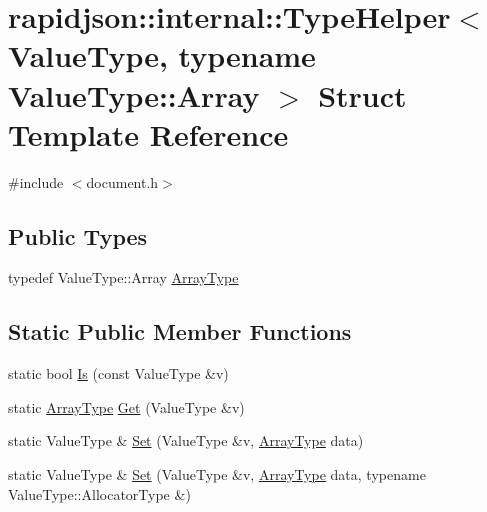 \hypertarget{structrapidjson_1_1internal_1_1_type_helper_3_01_value_type_00_01typename_01_value_type_1_1_array_01_4}{}\section{rapidjson\+::internal\+::Type\+Helper$<$ Value\+Type, typename Value\+Type\+::Array $>$ Struct Template Reference}
\label{structrapidjson_1_1internal_1_1_type_helper_3_01_value_type_00_01typename_01_value_type_1_1_array_01_4}


{\ttfamily \#include $<$document.\+h$>$}

\subsection*{Public Types}
\begin{DoxyCompactItemize}
\item 
typedef Value\+Type\+::\+Array \mbox{\hyperlink{structrapidjson_1_1internal_1_1_type_helper_3_01_value_type_00_01typename_01_value_type_1_1_array_01_4_af5f50f560631fef9cfc65b740145947a}{Array\+Type}}
\end{DoxyCompactItemize}
\subsection*{Static Public Member Functions}
\begin{DoxyCompactItemize}
\item 
static bool \mbox{\hyperlink{structrapidjson_1_1internal_1_1_type_helper_3_01_value_type_00_01typename_01_value_type_1_1_array_01_4_a8914d1a95dbffc359327c8fba620ae6d}{Is}} (const Value\+Type \&v)
\item 
static \mbox{\hyperlink{structrapidjson_1_1internal_1_1_type_helper_3_01_value_type_00_01typename_01_value_type_1_1_array_01_4_af5f50f560631fef9cfc65b740145947a}{Array\+Type}} \mbox{\hyperlink{structrapidjson_1_1internal_1_1_type_helper_3_01_value_type_00_01typename_01_value_type_1_1_array_01_4_a1c9de50e453294c4b8b32129b69eb7d1}{Get}} (Value\+Type \&v)
\item 
static Value\+Type \& \mbox{\hyperlink{structrapidjson_1_1internal_1_1_type_helper_3_01_value_type_00_01typename_01_value_type_1_1_array_01_4_acb9d4877fddc5f954c4f83cd11af61b1}{Set}} (Value\+Type \&v, \mbox{\hyperlink{structrapidjson_1_1internal_1_1_type_helper_3_01_value_type_00_01typename_01_value_type_1_1_array_01_4_af5f50f560631fef9cfc65b740145947a}{Array\+Type}} data)
\item 
static Value\+Type \& \mbox{\hyperlink{structrapidjson_1_1internal_1_1_type_helper_3_01_value_type_00_01typename_01_value_type_1_1_array_01_4_a332763c2bd550da67a7342ade4cee2c3}{Set}} (Value\+Type \&v, \mbox{\hyperlink{structrapidjson_1_1internal_1_1_type_helper_3_01_value_type_00_01typename_01_value_type_1_1_array_01_4_af5f50f560631fef9cfc65b740145947a}{Array\+Type}} data, typename Value\+Type\+::\+Allocator\+Type \&)
\end{DoxyCompactItemize}


